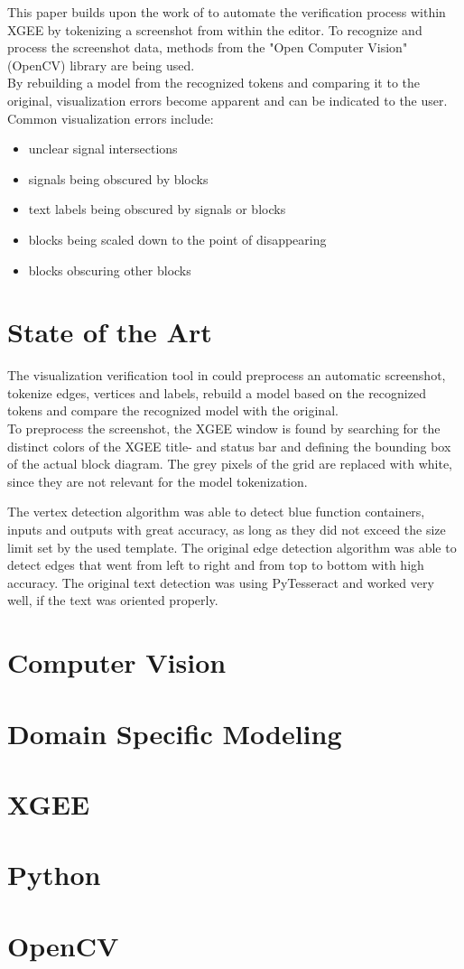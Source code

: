 This paper builds upon the work of \cite{ar_prof_paper} to automate the verification process within XGEE by tokenizing a screenshot from within the editor. To recognize and process the screenshot data, methods from the "Open Computer Vision" (OpenCV) library are being used.\\
By rebuilding a model from the recognized tokens and comparing it to the original, visualization errors become apparent and can be indicated to the user.
Common visualization errors include:
\begin{itemize}
    \item unclear signal intersections
    \item signals being obscured by blocks
    \item text labels being obscured by signals or blocks
    \item blocks being scaled down to the point of disappearing
    \item blocks obscuring other blocks
\end{itemize}

\section{State of the Art}
\label{sec_state_of_the_art}

The visualization verification tool in \cite{ar_prof_paper} could preprocess an automatic screenshot, tokenize edges, vertices and labels, rebuild a model based on the recognized tokens and compare the recognized model with the original.\\
To preprocess the screenshot, the XGEE window is found by searching for the distinct colors of the XGEE title- and status bar and defining the bounding box of the actual block diagram. The grey pixels of the grid are replaced with white, since they are not relevant for the model tokenization.

The vertex detection algorithm was able to detect blue function containers, inputs and outputs with great accuracy, as long as they did not exceed the size limit set by the used template.
The original edge detection algorithm was able to detect edges that went from left to right and from top to bottom with high accuracy. 
The original text detection was using PyTesseract and worked very well, if the text was oriented properly.

\section{Computer Vision}
    
\section{Domain Specific Modeling}

\section{XGEE}

\section{Python}

\section{OpenCV}